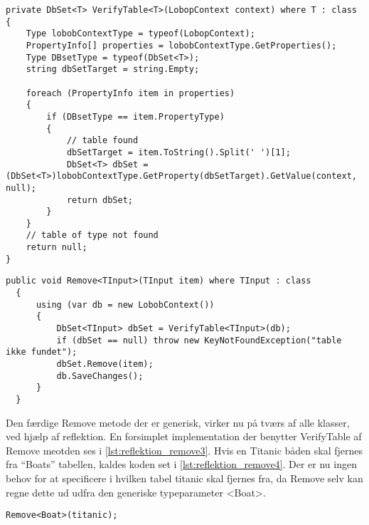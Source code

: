 \begin{lstlisting}[label=lst:reflektion_verifytable, caption={Metode der tjekker om en tabel af typen T findes i databasen.}]
private DbSet<T> VerifyTable<T>(LobopContext context) where T : class
{
    Type lobobContextType = typeof(LobopContext);
    PropertyInfo[] properties = lobobContextType.GetProperties();
    Type DBsetType = typeof(DbSet<T>);
    string dbSetTarget = string.Empty;

    foreach (PropertyInfo item in properties)
    {
        if (DBsetType == item.PropertyType)
        {
            // table found
            dbSetTarget = item.ToString().Split(' ')[1];
            DbSet<T> dbSet = (DbSet<T>)lobobContextType.GetProperty(dbSetTarget).GetValue(context, null);
            return dbSet;
        }
    }
    // table of type not found
    return null;
}
\end{lstlisting}

\begin{lstlisting}[label=lst:reflektion_remove3, caption={Remove metode der kan tage en vilkårlig klasse ind, finde den rette tabel og derefter slette det parametiserede objekt}]
  public void Remove<TInput>(TInput item) where TInput : class
  {
      using (var db = new LobobContext())
      {
          DbSet<TInput> dbSet = VerifyTable<TInput>(db);
          if (dbSet == null) throw new KeyNotFoundException("table ikke fundet");
          dbSet.Remove(item);
          db.SaveChanges();
      }
  } 
\end{lstlisting}

Den færdige Remove metode der er generisk, virker nu på tværs af alle klasser, ved hjælp af reflektion. En forsimplet implementation der benytter VerifyTable af Remove meotden ses i \cref{lst:reflektion_remove3}. Hvis en Titanic båden skal fjernes fra \enquote{Boats} tabellen, kaldes koden set i \cref{lst:reflektion_remove4}. Der er nu ingen behov for at specificere i hvilken tabel titanic skal fjernes fra, da Remove selv kan regne dette ud udfra den generiske typeparameter <Boat>.

\begin{lstlisting}[label=lst:reflektion_remove4]
Remove<Boat>(titanic);
\end{lstlisting}
